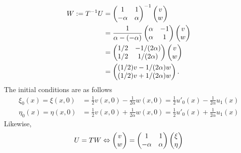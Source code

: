 \documentclass[12pt]{article}
\begin{document}
\begin{enumerate}
\begin{align}
		      W := T^{-1}U 
		       & = \begin{pmatrix} 1 & 1\\ -\alpha&\alpha \end{pmatrix}^{-1}
		      \begin{pmatrix} v\\w\end{pmatrix}           \\
		       & = \frac{1}{\alpha-(-\alpha)}
		      \begin{pmatrix} \alpha & -1\\ \alpha&1 \end{pmatrix}
		      \begin{pmatrix} v\\w\end{pmatrix}\notag     \\
		       & =
		      \begin{pmatrix} 1/2 & -1/(2\alpha)\\ 1/2&1/(2\alpha) \end{pmatrix}
		      \begin{pmatrix} v\\w\end{pmatrix} \notag    \\
		       & = 
		      \begin{pmatrix} (1/2) v - 1/(2\alpha) w \\ (1/2) v + 1/(2\alpha) w \end{pmatrix}.
	      \end{align}
	      The initial conditions are as follows
	      \begin{align}
		      \xi_{0}(x)
		      = \xi(x,0)
		       & = \frac{1}{2}v(x,0)-\frac{1}{2\alpha}w(x,0)
		      = \frac{1}{2}u'_{0}(x)-\frac{1}{2\alpha}u_{1}(x) \\
		      \eta_{0}(x) = \eta(x,0)
		       & = \frac{1}{2}v(x,0)+\frac{1}{2\alpha}w(x,0) 
		      = \frac{1}{2}u'_{0}(x)+\frac{1}{2\alpha}u_{1}(x)
	      \end{align}
	      Likewise,
	      \begin{align}
		      U = TW 
		       & \Leftrightarrow 
		      \begin{pmatrix} v\\w\end{pmatrix}
		      =
		      \begin{pmatrix} 1 & 1\\ -\alpha&\alpha \end{pmatrix}
		      \begin{pmatrix} \xi\\\eta \end{pmatrix} \notag \\

\end{align}
\end{enumerate}
\end{document}
